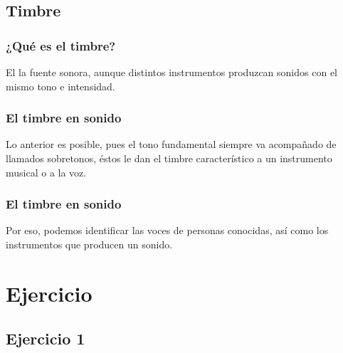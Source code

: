 \documentclass[14pt]{beamer}
\begin{document}
\subsection{Timbre}

\begin{frame}
\frametitle{¿Qué es el timbre?}
El  la fuente sonora, aunque
distintos instrumentos produzcan sonidos con el mismo tono e intensidad.
\end{frame}
\begin{frame}
\frametitle{El timbre en sonido}
Lo anterior es posible, pues el tono fundamental siempre va acompañado de  llamados sobretonos, éstos le dan el timbre característico a un instrumento musical o a la voz.
\end{frame}
\begin{frame}
\frametitle{El timbre en sonido}
Por eso, podemos identificar las voces de personas conocidas, así como los instrumentos que producen un sonido.
\end{frame}

\section{Ejercicio}
\subsection{Ejercicio 1}
\end{document}
